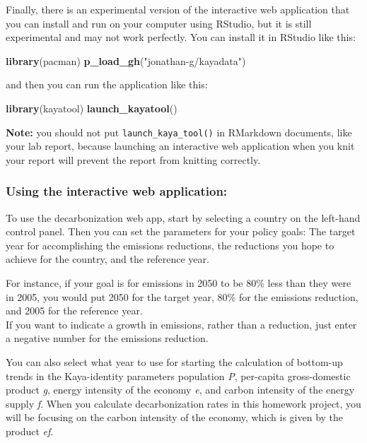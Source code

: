 \documentclass[
]{article}
\newenvironment{Shaded}{\begin{snugshade}}{\end{snugshade}}
\newcommand{\KeywordTok}[1]{\textcolor[rgb]{0.13,0.29,0.53}{\textbf{#1}}}
\newcommand{\NormalTok}[1]{#1}
\newcommand{\StringTok}[1]{\textcolor[rgb]{0.31,0.60,0.02}{#1}}
\begin{document}
Finally, there is an experimental version of the interactive web
application that you can install and run on your computer using RStudio,
but it is still experimental and may not work perfectly. You can install
it in RStudio like this:

\begin{Shaded}
\begin{Highlighting}[]
\KeywordTok{library}\NormalTok{(pacman)}
\KeywordTok{p\_load\_gh}\NormalTok{(}\StringTok{"jonathan{-}g/kayadata"}\NormalTok{)}
\end{Highlighting}
\end{Shaded}

and then you can run the application like this:

\begin{Shaded}
\begin{Highlighting}[]
\KeywordTok{library}\NormalTok{(kayatool)}
\KeywordTok{launch\_kayatool}\NormalTok{()}
\end{Highlighting}
\end{Shaded}

\textbf{Note:} you should not put \texttt{launch\_kaya\_tool()} in
RMarkdown documents, like your lab report, because launching an
interactive web application when you knit your report will prevent the
report from knitting correctly.

\hypertarget{using-the-interactive-web-application}{%
\subsubsection{Using the interactive web
application:}\label{using-the-interactive-web-application}}

To use the decarbonization web app, start by selecting a country on the
left-hand control panel. Then you can set the parameters for your policy
goals: The target year for accomplishing the emissions reductions, the
reductions you hope to achieve for the country, and the reference year.

For instance, if your goal is for emissions in 2050 to be 80\% less than
they were in 2005, you would put 2050 for the target year, 80\% for the
emissions reduction, and 2005 for the reference year.\\
If you want to indicate a growth in emissions, rather than a reduction,
just enter a negative number for the emissions reduction.

You can also select what year to use for starting the calculation of
bottom-up trends in the Kaya-identity parameters population \emph{P},
per-capita gross-domestic product \emph{g}, energy intensity of the
economy \emph{e}, and carbon intensity of the energy supply \emph{f}.
When you calculate decarbonization rates in this homework project, you
will be focusing on the carbon intensity of the economy, which is given
by the product \emph{ef}.
\end{document}
